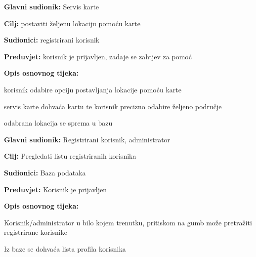 \noindent {}
\begin{packed_item}
	
	\item \textbf{Glavni sudionik: } Servis karte
	\item  \textbf{Cilj:} postaviti željenu lokaciju pomoću karte
	\item  \textbf{Sudionici:} registrirani korisnik
	\item  \textbf{Preduvjet:} korisnik je prijavljen, zadaje se zahtjev za pomoć
	\item  \textbf{Opis osnovnog tijeka:}
	
	\item[] \begin{packed_enum}
		
		\item korisnik odabire opciju postavljanja lokacije pomoću karte
		\item servis karte dohvaća kartu te korisnik precizno odabire željeno područje
		\item odabrana lokacija se sprema u bazu
	\end{packed_enum}
\end{packed_item}
\noindent {}
\begin{packed_item}
	
	\item \textbf{Glavni sudionik: }Registrirani korisnik, administrator
	\item  \textbf{Cilj:} Pregledati listu registriranih korisnika
	\item  \textbf{Sudionici:} Baza podataka
	\item  \textbf{Preduvjet:} Korisnik je prijavljen
	\item  \textbf{Opis osnovnog tijeka:}
	
	\item[] \begin{packed_enum}
		
		\item Korisnik/administrator u bilo kojem trenutku, pritiskom na gumb može pretražiti registrirane korisnike
		\item Iz baze se dohvaća lista profila korisnika
	\end{packed_enum}
\end{packed_item}
\noindent {}

